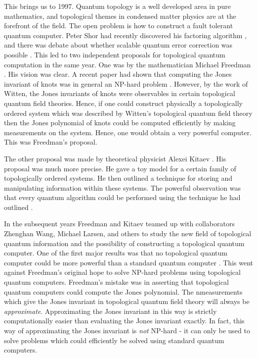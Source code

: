 \documentclass{article}
\theoremstyle{definition}
\numberwithin{figure}{section}
\begin{document}
This brings us to 1997. Quantum topology is a well developed area in pure mathematics, and topological themes in condensed matter physics are at the forefront of the field. The open problem is how to construct a fault tolerant quantum computer. Peter Shor had recently discovered his factoring algorithm \cite{shor1994algorithms}, and there was debate about whether scalable quantum error correction was possible \cite{landauer1995quantum}. This led to two independent proposals for topological quantum computation in the same year. One was by the mathematician Michael Freedman \cite{freedman1998p}. His vision was clear. A recent paper had shown that computing the Jones invariant of knots was in general an NP-hard problem \cite{jaeger1990computational}. However, by the work of Witten, the Jones invariants of knots were observables in certain topological quantum field theories. Hence, if one could construct physically a topologically ordered system which was described by Witten’s topological quantum field theory then the Jones polynomial of knots could be computed efficiently by making measurements on the system. Hence, one would obtain a very powerful computer. This was Freedman’s proposal.

The other proposal was made by theoretical physicist Alexei Kitaev \cite{kitaev2003fault}. His proposal was much more precise. He gave a toy model for a certain family of topologically ordered systems. He then outlined a technique for storing and manipulating information within these systems. The powerful observation was that every quantum algorithm could be performed using the technique he had outlined \cite{mochon2003anyons}.

In the subsequent years Freedman and Kitaev teamed up with collaborators Zhenghan Wang, Michael Larsen, and others to study the new field of topological quantum information and the possibility of constructing a topological quantum computer. One of the first major results was that no topological quantum computer could be more powerful than a standard quantum computer \cite{freedman2002simulation}. This went against Freedman’s original hope to solve NP-hard problems using topological quantum computers. Freedman’s mistake was in asserting that topological quantum computers could compute the Jones polynomial. The nmeasurements which give the Jones invariant in topological quantum field theory will always be \textit{approximate}. Approximating the Jones invariant in this way is strictly computationally easier than evaluating the Jones invariant exactly. In fact, this way of approximating the Jones invariant is \textit{not} NP-hard - it can only be used to solve problems which could efficiently be solved using standard quantum computers.
\end{document}
